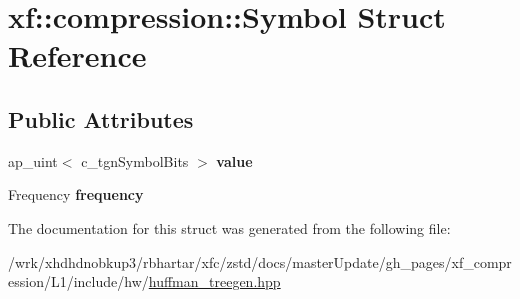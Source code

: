 \hypertarget{structxf_1_1compression_1_1Symbol}{\section{xf\-:\-:compression\-:\-:Symbol Struct Reference}
\label{structxf_1_1compression_1_1Symbol}
}
\subsection*{Public Attributes}
\begin{DoxyCompactItemize}
\item 
\hypertarget{structxf_1_1compression_1_1Symbol_abfb2379c9cebaad8fed374f5d95c99e0}{ap\-\_\-uint$<$ c\-\_\-tgn\-Symbol\-Bits $>$ {\bfseries value}}\label{structxf_1_1compression_1_1Symbol_abfb2379c9cebaad8fed374f5d95c99e0}

\item 
\hypertarget{structxf_1_1compression_1_1Symbol_aae386e791b6d55a0731e52bc6328806d}{Frequency {\bfseries frequency}}\label{structxf_1_1compression_1_1Symbol_aae386e791b6d55a0731e52bc6328806d}

\end{DoxyCompactItemize}


The documentation for this struct was generated from the following file\-:\begin{DoxyCompactItemize}
\item 
/wrk/xhdhdnobkup3/rbhartar/xfc/zstd/docs/master\-Update/gh\-\_\-pages/xf\-\_\-compression/\-L1/include/hw/\hyperlink{huffman__treegen_8hpp}{huffman\-\_\-treegen.\-hpp}\end{DoxyCompactItemize}
